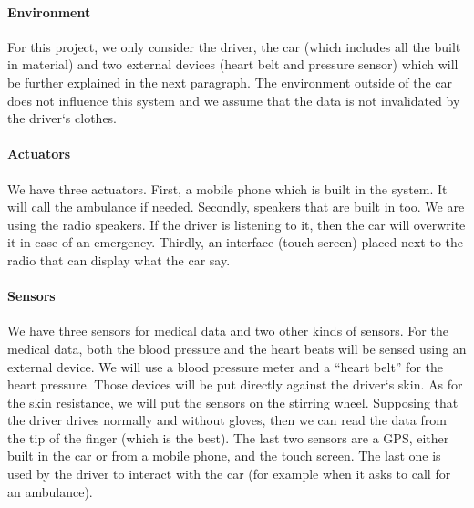 \paragraph{Environment} For this project, we only consider the driver, the car (which includes all the built in material) and two external devices (heart belt and pressure sensor) which will be further explained in the next paragraph. The environment outside of the car does not influence this system and we assume that the data is not invalidated by the driver`s clothes.

\paragraph{Actuators} We have three actuators. First, a mobile phone which is built in the system. It will call the ambulance if needed. Secondly, speakers that are built in too. We are using the radio speakers. If the driver is listening to it, then the car will overwrite it in case of an emergency. Thirdly, an interface (touch screen) placed next to the radio that can display what the car say.

\paragraph{Sensors} We have three sensors for medical data and two other kinds of sensors. For the medical data, both the blood pressure and the heart beats will be sensed using an external device. We will use a blood pressure meter and a “heart belt” for the heart pressure. Those devices will be put directly against the driver`s skin. As for the skin resistance, we will put the sensors on the stirring wheel. Supposing that the driver drives normally and without gloves, then we can read the data from the tip of the finger (which is the best). The last two sensors are a GPS, either built in the car or from a mobile phone, and the touch screen. The last one is used by the driver to interact with the car (for example when it asks to call for an ambulance).

